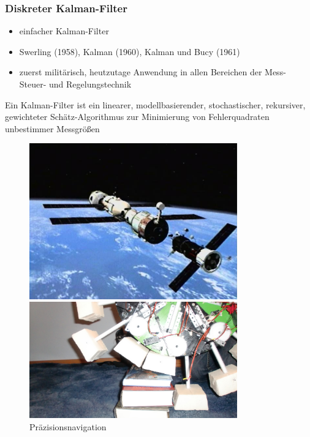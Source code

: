 \documentclass[10pt,a4paper,oneside]{beamer}
\begin{document}
\begin{frame}
  \frametitle{Diskreter Kalman-Filter}
  \begin{itemize}
  	  \item einfacher Kalman-Filter
	  \item Swerling (1958), Kalman (1960), Kalman und Bucy (1961)
	  \item zuerst militärisch, heutzutage Anwendung in allen Bereichen der Mess- Steuer- und Regelungstechnik
  \end{itemize}
  \begin{definition}
  	Ein Kalman-Filter ist ein linearer, modellbasierender, stochastischer, rekursiver, gewichteter Schätz-Algorithmus zur Minimierung von Fehlerquadraten unbestimmer Messgrößen
  \end{definition}
  \begin{figure}[htbp]
        \begin{minipage}{0.3\textwidth}
         \centering
          \includegraphics[width=0.8\textwidth]{images/docking.jpg}
          \caption{Präzisionsnavigation}
        \end{minipage}\hfill
        \begin{minipage}{0.3\textwidth}
         \centering
          \includegraphics[width=0.8\textwidth]{images/smartwheel.jpg}

\end{minipage}
\end{figure}
\end{frame}
\end{document}
